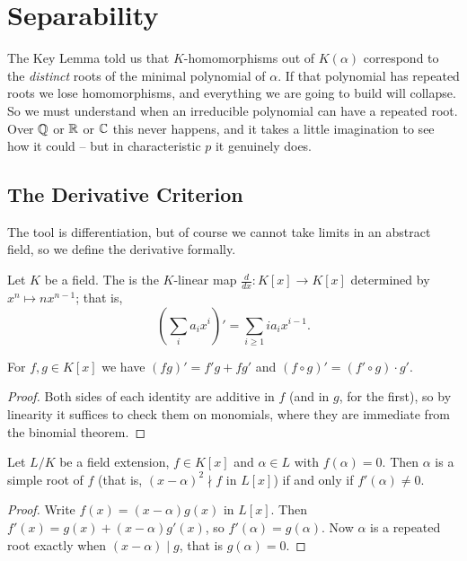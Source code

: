\documentclass[a4paper]{scrartcl}
\begin{document}
\section{Separability}

The Key Lemma told us that $K$-homomorphisms out of $K(\alpha)$ correspond to the \emph{distinct} roots of the minimal polynomial of $\alpha$. If that polynomial has repeated roots we lose homomorphisms, and everything we are going to build will collapse. So we must understand when an irreducible polynomial can have a repeated root. Over $\mathbb{Q}$ or $\mathbb{R}$ or $\mathbb{C}$ this never happens, and it takes a little imagination to see how it could -- but in characteristic $p$ it genuinely does.

\subsection{The Derivative Criterion}

The tool is differentiation, but of course we cannot take limits in an abstract field, so we define the derivative formally.

\begin{definition}
	Let $K$ be a field. The  is the $K$-linear map $\frac{d}{dx} : K[x] \to K[x]$ determined by $x^n \mapsto n x^{n-1}$; that is,
	$$\left(\sum_{i} a_i x^i\right)' = \sum_{i \geq 1} i a_i x^{i-1}.$$
\end{definition}

\begin{proposition}
	For $f, g \in K[x]$ we have $(fg)' = f'g + fg'$ and $(f \circ g)' = (f' \circ g)\cdot g'$.
\end{proposition}

\begin{proof}
	Both sides of each identity are additive in $f$ (and in $g$, for the first), so by linearity it suffices to check them on monomials, where they are immediate from the binomial theorem.
\end{proof}

\begin{lemma}\label{lem:simpleroot}
	Let $L/K$ be a field extension, $f \in K[x]$ and $\alpha \in L$ with $f(\alpha) = 0$. Then $\alpha$ is a simple root of $f$ (that is, $(x-\alpha)^2 \nmid f$ in $L[x]$) if and only if $f'(\alpha) \neq 0$.
\end{lemma}

\begin{proof}
	Write $f(x) = (x-\alpha)g(x)$ in $L[x]$. Then $f'(x) = g(x) + (x-\alpha)g'(x)$, so $f'(\alpha) = g(\alpha)$. Now $\alpha$ is a repeated root exactly when $(x-\alpha) \mid g$, that is $g(\alpha) = 0$.
\end{proof}
\end{document}
